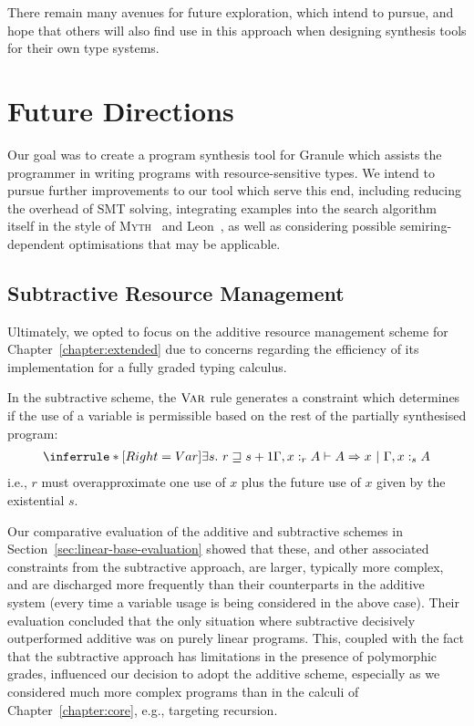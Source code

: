 There remain many avenues for future exploration, which intend to pursue, and
hope that others will also find use in this approach when designing synthesis
tools for their own type systems. 

\section{Future Directions}
\label{section:future}

Our goal was to create a program synthesis tool for Granule which assists the
programmer in writing programs with resource-sensitive types. We intend to
pursue further improvements to our tool which serve this end, including reducing
the overhead of SMT solving, integrating examples into the search algorithm
itself in the style of \textsc{Myth}~\citep{oseraMYTH1} and
Leon~\citep{10.1145/2509136.2509555}, as well as considering possible
semiring-dependent optimisations that may be applicable.

\subsection{Subtractive Resource Management}
Ultimately, we opted to focus on the additive resource management scheme for
Chapter~\ref{chapter:extended} due to concerns regarding the efficiency of its
implementation for a fully graded typing calculus.

In the subtractive scheme, the $\textsc{Var}$ rule generates a constraint which
determines if the use of a variable is permissible based on the rest of the
partially synthesised program:
\begin{align*}
  \inferrule*[Right=Var]
  {\exists s .\ r \sqsupseteq s + 1}
  {\Gamma, x :_{r} A \vdash A \Rightarrow x\ |\ \Gamma, x :_{s} A}
\end{align*}
i.e., $r$ must overapproximate one use of $x$ plus the future use of
$x$ given by the existential $s$.

Our comparative evaluation of the additive and subtractive schemes in
Section~\ref{sec:linear-base-evaluation} showed that these, and other associated
constraints from the subtractive approach, are larger, typically more complex,
and are discharged more frequently than their counterparts in the additive
system (every time a variable usage is being considered in the above case).
Their evaluation concluded that the only situation where subtractive decisively
outperformed additive was on purely linear programs. This, coupled with the fact
that the subtractive approach has limitations in the presence of polymorphic
grades, influenced our decision to adopt the additive scheme, especially as we
considered much more complex programs than in the calculi of
Chapter~\ref{chapter:core}, e.g., targeting recursion.


